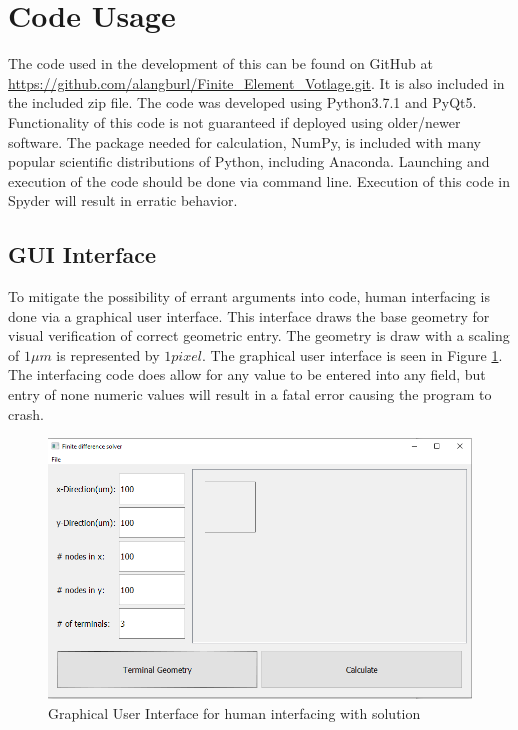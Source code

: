 \documentclass{article}[12pt]
\begin{document}
\section{Code Usage}
		The code used in the development of this can be found on GitHub at \url{https://github.com/alangburl/Finite_Element_Votlage.git}. It is also included in the included zip file. The code was developed using Python3.7.1 and PyQt5. Functionality of this code is not guaranteed if deployed using older/newer software. The package needed for calculation, NumPy, is included with many popular scientific distributions of Python, including Anaconda. Launching and execution of the code should be done via command line. Execution of this code in Spyder will result in erratic behavior.
\subsection{GUI Interface}
	To mitigate the possibility of errant arguments into code, human interfacing is done via a graphical user interface. This interface draws the base geometry for visual verification of correct geometric entry. The geometry is draw with a scaling of $1\mu m$ is represented by $1pixel$. The graphical user interface is seen in Figure \ref{fig:gui}. The interfacing code does allow for any value to be entered into any field, but entry of none numeric values will result in a fatal error causing the program to crash. 
	\begin{figure}[h!]
		\centering
		\includegraphics[width=\linewidth]{GUI.png}
		\caption{Graphical User Interface for human interfacing with solution}
		\label{fig:gui}
	\end{figure}
\end{document}
